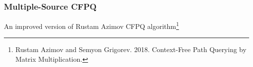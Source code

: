 \documentclass[xcolor=table,aspectratio=169]{beamer}
\begin{document}
\begin{frame}[fragile] \frametitle{Multiple-Source CFPQ}
\begin{center}
An improved version of Rustam Azimov CFPQ algorithm\footnote{Rustam Azimov and Semyon Grigorev. 2018. Context-Free Path Querying by Matrix Multiplication.}
\end{center}
\begin{minipage}[t]{0.45\textwidth}
\end{minipage}
\begin{minipage}[t]{0.54\textwidth}
  \vspace{-2cm}
    \begin{itemize}
    \end{itemize}
  \end{minipage}
\end{frame}
\end{document}
